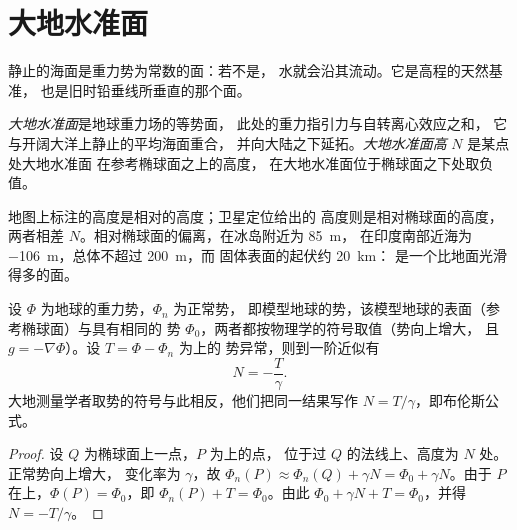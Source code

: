 \section{大地水准面}

静止的海面是重力势为常数的面：若不是，
水就会沿其流动。它是高程的天然基准，
也是旧时铅垂线所垂直的那个面。

\begin{definition}\label{def:b1:isostasy-gravity:geoid}
\emph{大地水准面}是地球重力场的等势面，
此处的重力指引力与自转离心效应之和，
它与开阔大洋上静止的平均海面重合，
并向大陆之下延拓。\emph{大地水准面高} $N$ 是某点处大地水准面
在参考椭球面之上的高度，
在大地水准面位于椭球面之下处取负值。
\end{definition}

地图上标注的高度是相对的高度；卫星定位给出的
高度则是相对椭球面的高度，两者相差
$N$。相对椭球面的偏离，在冰岛附近为 \qty{+85}{m}，
在印度南部近海为 \qty{-106}{m}，总体不超过 \qty{200}{m}，而
固体表面的起伏约 \qty{20}{km}：
是一个比地面光滑得多的面。

\begin{proposition}[大地水准面高与势异常]\label{prop:b1:isostasy-gravity:bruns}
设 $\Phi$ 为地球的重力势，$\Phi_n$ 为正常势，
即模型地球的势，该模型地球的表面（参考椭球面）与具有相同的
势 $\Phi_0$，两者都按物理学的符号取值（势向上增大，
且 $g = -\nabla\Phi$）。设 $T = \Phi - \Phi_n$ 为上的
势异常，则到一阶近似有
\[
  N = -\frac{T}{\gamma} .
\]
大地测量学者取势的符号与此相反，他们把同一结果写作
$N = T/\gamma$，即布伦斯公式。
\end{proposition}

\begin{proof}
设 $Q$ 为椭球面上一点，$P$ 为上的点，
位于过 $Q$ 的法线上、高度为 $N$ 处。正常势向上增大，
变化率为 $\gamma$，故 $\Phi_n(P) \approx \Phi_n(Q) + \gamma N = \Phi_0 +
\gamma N$。由于 $P$ 在上，$\Phi(P) = \Phi_0$，即
$\Phi_n(P) + T = \Phi_0$。由此 $\Phi_0 + \gamma N + T = \Phi_0$，并得 $N =
-T/\gamma$。
\end{proof}

